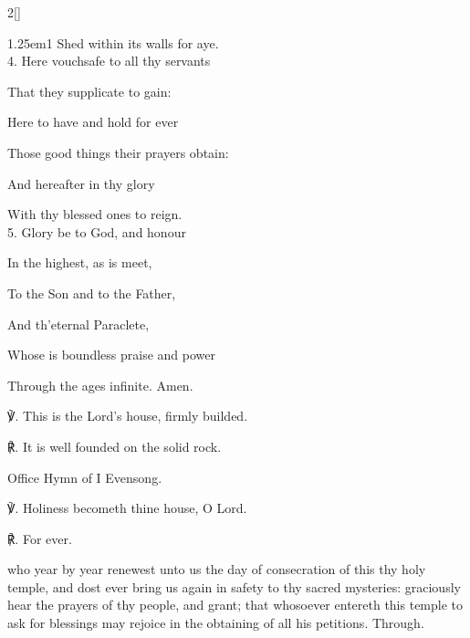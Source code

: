\begin{paracol}{2}[]
\begin{hangparas}{1.25em}{1}
Shed within its walls for aye.\\

4. Here vouchsafe to all thy servants

That they supplicate to gain:

Here to have and hold for ever

Those good things their prayers obtain:

And hereafter in thy glory

With thy blessed ones to reign.\\

5. Glory be to God, and honour

In the highest, as is meet,

To the Son and to the Father,

And th'eternal Paraclete,

Whose is boundless praise and power

Through the ages infinite. Amen.\\
\end{hangparas}

℣. This is the Lord's house, firmly builded.

℟. It is well founded on the solid rock.


\fussy
\end{paracol}

\secondEvensong


\begin{rubric}
	Office Hymn of I Evensong.
\end{rubric}

℣. Holiness becometh thine house, O Lord.

℟. For ever.



\collect
{} who year by year renewest unto us the day of consecration of this thy holy temple, and dost ever bring us again in safety to thy sacred mysteries: graciously hear the prayers of thy people, and grant; that whosoever entereth this temple to ask for blessings may rejoice in the obtaining of all his petitions. Through.

